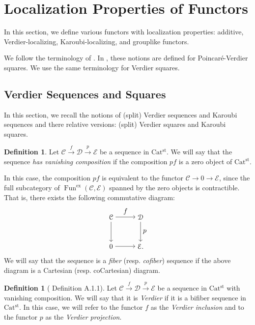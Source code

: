 \documentclass[a4paper,dvipdfmx,11pt,reqno]{amsart}
\DeclareMathOperator{\Fun}{Fun}
\newcommand{\C}{\mathcal{C}}
\newcommand{\D}{\mathcal{D}}
\newcommand{\E}{\mathcal{E}}
\newcommand{\Catst}{\mathrm{Cat^{st}}}
\theoremstyle{definition}
\newtheorem{definition}[theorem]{Definition}
\begin{document}
\section{Localization Properties of Functors} \label{sec.localization_properties}

In this section, we define various functors with localization properties: 
additive, Verdier-localizing, Karoubi-localizing, and grouplike functors.

We follow the terminology of \cite{CDH23}.
In \cite{CDH23}, these notions are defined for Poincar\'{e}-Verdier squares. 
We use the same terminology for Verdier squares.

\subsection{Verdier Sequences and Squares}

In this section, we recall the notions of (split) Verdier sequences and Karoubi sequences and there relative versions: (split) Verdier squares and Karoubi squares.

\begin{definition} \label{CDH23.rem.A.1.2}
  Let $\C \xrightarrow{f} \D \xrightarrow{p} \E$ be a sequence in $\Catst$.
  We will say that the sequence \textit{has vanishing composition} if the composition $pf$ is a zero object of $\Catst$.
  
  In this case, the composition $pf$ is equivalent to the functor $\C \to 0 \to \E$, since the full subcategory of $\Fun^{\mathrm{ex}}(\C,\E)$ spanned by the zero objects is contractible.
  That is, there exists the following commutative diagram:
  \[\begin{tikzpicture}[auto,->] 
    \node (tl) at (0,1.5) {$\C$}; 
    \node (tr) at (1.5,1.5) {$\D$};
    \node (bl) at (0,0) {$0$}; 
    \node (br) at (1.5,0) {$\E.$}; 
    \draw (tl) -- node {$f$} (tr); 
    \draw (bl) -- node[swap] {} (br); 
    \draw (tl) -- node[swap] {} (bl);
    \draw (tr) -- node {$p$} (br); 
  \end{tikzpicture}\]
  We will say that the sequence is a \textit{fiber} (resp. \textit{cofiber}) sequence if the above diagram is a Cartesian (resp. coCartesian) diagram.
\end{definition}

\begin{definition}[\cite{CDH23} Definition A.1.1] \label{CDH23.def.A.1.1}
  Let $\C \xrightarrow{f} \D \xrightarrow{p} \E$ be a sequence in $\Catst$ with vanishing composition.
  We will say that it is \textit{Verdier} if it is a bifiber sequence in $\Catst$.
  In this case, we will refer to the functor $f$ as the \textit{Verdier inclusion} and to the functor $p$ as the \textit{Verdier projection}.
\end{definition}
\end{document}

